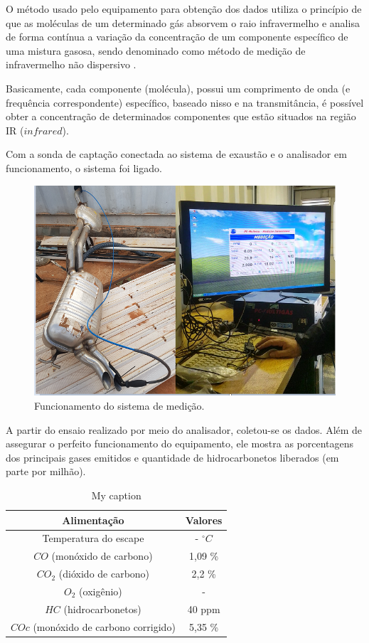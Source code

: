 O método usado pelo equipamento para obtenção dos dados utiliza o princípio de que as moléculas de um determinado gás absorvem o raio infravermelho e analisa de forma contínua a variação da concentração de um componente específico de uma mistura gasosa, sendo denominado como método de medição de infravermelho não dispersivo \cite{nereu}.

Basicamente, cada componente (molécula), possui um comprimento de onda (e frequência correspondente) específico, baseado nisso e na transmitância, é possível obter a concentração de determinados componentes que estão situados na região IR ($infrared$).

Com a sonda de captação conectada ao sistema de exaustão e o analisador em funcionamento, o sistema foi ligado.

\begin{figure}[h!]
	\centering
	\includegraphics[keepaspectratio=true,scale= 0.8]{figuras/DR.png}
	\caption{Funcionamento do sistema de medição.}
	\label{funcionamento}
\end{figure}

A partir do ensaio realizado por meio do analisador, coletou-se os dados. Além de assegurar o perfeito funcionamento do equipamento, ele mostra as porcentagens dos principais gases emitidos e quantidade de hidrocarbonetos liberados (em parte por milhão).

\begin{table}[]
	\centering
	\caption{My caption}
	\label{my-label}
	\begin{tabular}{|c|c|}
		\hline
		\textbf{Alimentação}                  & \textbf{Valores} \\ \hline
		Temperatura do escape                 & - $^{\circ}C$    \\ \hline
		$CO$ (monóxido de carbono)            & 1,09 \%          \\ \hline
		$CO_{2}$ (dióxido de carbono)         & 2,2 \%           \\ \hline
		$O_{2}$ (oxigênio)                    & -                \\ \hline
		$HC$ (hidrocarbonetos)                & 40 ppm           \\ \hline
		$COc$ (monóxido de carbono corrigido) & 5,35 \%          \\ \hline
	\end{tabular}
\end{table}

